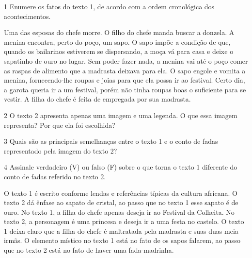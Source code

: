 \num{1} Enumere os fatos do texto 1, de acordo com a ordem cronológica
dos acontecimentos.

\begin{boxlist}
 Uma das esposas do chefe morre.
 O filho do chefe manda buscar a donzela.
 A menina encontra, perto do poço, um sapo.
 O sapo impõe a condição de que, quando os bailarinos estiverem se
dispersando, a moça vá para casa e deixe o sapatinho de ouro no lugar.
 Sem poder fazer nada, a menina vai até o poço comer as raspas de
alimento que a madrasta deixava para ela.
 O sapo engole e vomita a menina, fornecendo-lhe roupas e joias para
que ela possa ir ao festival.
 Certo dia, a garota queria ir a um festival, porém não tinha roupas
boas o suficiente para se vestir.
 A filha do chefe é feita de empregada por sua madrasta.
\end{boxlist}

\num{2} O texto 2 apresenta apenas uma imagem e uma legenda. O que essa
imagem representa? Por que ela foi escolhida?


\num{3} Quais são as principais semelhanças entre o texto 1 e o conto de
fadas representado pela imagem do texto 2?


\num{4} Assinale verdadeiro (V) ou falso (F) sobre o que torna o texto 1
diferente do conto de fadas referido no texto 2.

\begin{boxlist}
 O texto 1 é escrito conforme lendas e referências típicas da cultura
africana.
 O texto 2 dá ênfase ao sapato de cristal, ao passo que no texto 1
esse sapato é de ouro.
 No texto 1, a filha do chefe apenas deseja ir ao Festival da
Colheita.
 No texto 2, a personagem é uma princesa e deseja ir a uma festa no
castelo.
 O texto 1 deixa claro que a filha do chefe é maltratada pela
madrasta e suas duas meia-irmãs.
 O elemento místico no texto 1 está no fato de os sapos falarem, ao
passo que no texto 2 está no fato de haver uma fada-madrinha.
\end{boxlist}


